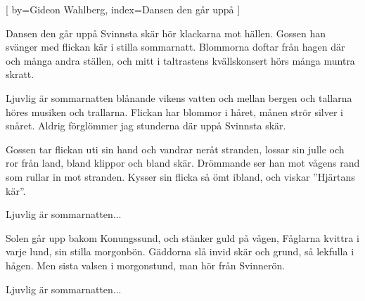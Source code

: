 


[ 	%
	by={Gideon Wahlberg},
	index={Dansen den går uppå }]		%
	
\beginverse*		%
Dansen den går uppå Svinnsta skär
hör klackarna mot hällen.
Gossen han svänger med flickan kär
i stilla sommarnatt.
Blommorna doftar från hagen där
och många andra ställen,
och mitt i taltrastens kvällskonsert
hörs många muntra skratt.
\endverse			%

\beginchorus	
Ljuvlig är sommarnatten
blånande vikens vatten
och mellan bergen och tallarna
höres musiken och trallarna.
Flickan har blommor i håret,
månen strör silver i snåret.
Aldrig förglömmer jag stunderna där
uppå Svinnsta skär.
\endchorus

\beginverse*		%
Gossen tar flickan uti sin hand 
och vandrar neråt stranden,
lossar sin julle och ror från land, 
bland klippor och bland skär.
Drömmande ser han mot vågens rand
som rullar in mot stranden.
Kysser sin flicka så ömt ibland, 
och viskar ''Hjärtans kär''.
\endverse			%

\beginchorus	
Ljuvlig är sommarnatten...
\endchorus

\beginverse*		%
Solen går upp bakom Konungssund, 
och stänker guld på vågen,
Fåglarna kvittra i varje lund, 
sin stilla morgonbön.
Gäddorna slå invid skär och grund, 
så lekfulla i hågen.
Men sista valsen i morgonstund, 
man hör från Svinnerön.
\endverse			%

\beginchorus	
Ljuvlig är sommarnatten...
\endchorus
\endsong			%
